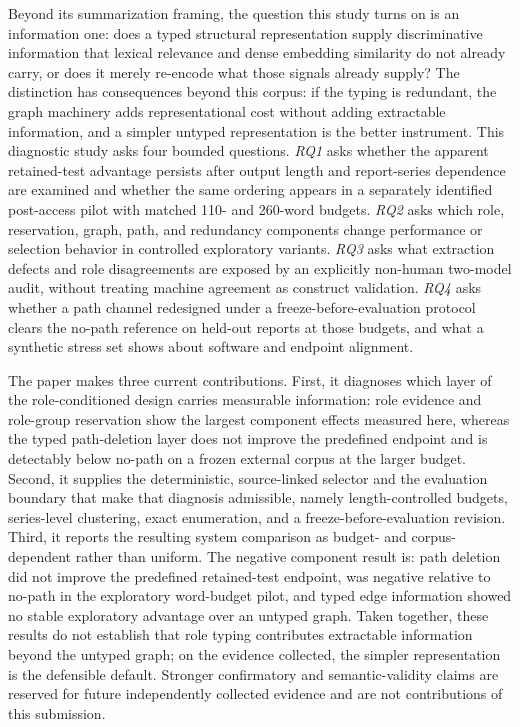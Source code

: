 \documentclass[information,article,submit,moreauthors]{Definitions/mdpi}
\begin{document}
Beyond its summarization framing, the question this study turns on is an information one: does a typed structural representation supply discriminative information that lexical relevance and dense embedding similarity do not already carry, or does it merely re-encode what those signals already supply? The distinction has consequences beyond this corpus: if the typing is redundant, the graph machinery adds representational cost without adding extractable information, and a simpler untyped representation is the better instrument. This diagnostic study asks four bounded questions. \textit{RQ1} asks whether the apparent retained-test advantage persists after output length and report-series dependence are examined and whether the same ordering appears in a separately identified post-access pilot with matched 110- and 260-word budgets. \textit{RQ2} asks which role, reservation, graph, path, and redundancy components change performance or selection behavior in controlled exploratory variants. \textit{RQ3} asks what extraction defects and role disagreements are exposed by an explicitly non-human two-model audit, without treating machine agreement as construct validation. \textit{RQ4} asks whether a path channel redesigned under a freeze-before-evaluation protocol clears the no-path reference on held-out reports at those budgets, and what a synthetic stress set shows about software and endpoint alignment.

The paper makes three current contributions. First, it diagnoses which layer of the role-conditioned design carries measurable information: role evidence and role-group reservation show the largest component effects measured here, whereas the typed path-deletion layer does not improve the predefined endpoint and is detectably below no-path on a frozen external corpus at the larger budget. Second, it supplies the deterministic, source-linked selector and the evaluation boundary that make that diagnosis admissible, namely length-controlled budgets, series-level clustering, exact enumeration, and a freeze-before-evaluation revision. Third, it reports the resulting system comparison as budget- and corpus-dependent rather than uniform. The negative component result is: path deletion did not improve the predefined retained-test endpoint, was negative relative to no-path in the exploratory word-budget pilot, and typed edge information showed no stable exploratory advantage over an untyped graph. Taken together, these results do not establish that role typing contributes extractable information beyond the untyped graph; on the evidence collected, the simpler representation is the defensible default. Stronger confirmatory and semantic-validity claims are reserved for future independently collected evidence and are not contributions of this submission.
\end{document}
